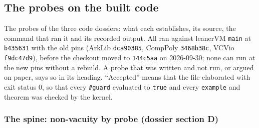 \subsection{The probes on the built code}\label{sec:gen-probes}

The probes of the three code dossiers: what each establishes, its source, the command that ran it and its recorded output. All ran against leanerVM \texttt{main} at \texttt{b435631} with the old pins (ArkLib \texttt{dca90385}, CompPoly \texttt{3468b38c}, VCVio \texttt{f9dc47d9}), before the checkout moved to \texttt{144c5aa} on 2026-09-30; none can run at the new pins without a rebuild. A probe that was written and not run, or argued on paper, says so in its heading. \enquote{Accepted} means that the file elaborated with exit status 0, so that every \texttt{\#guard} evaluated to \texttt{true} and every \texttt{example} and theorem was checked by the kernel.

\subsubsection{The spine: non-vacuity by probe (dossier section D)}\label{sec:gen-probes-spine}

\par{}\par

